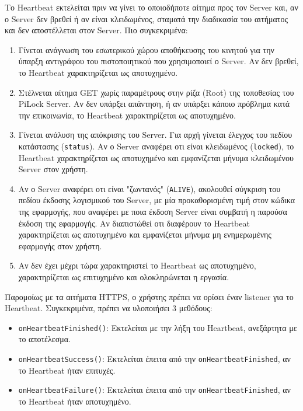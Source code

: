 	Το Heartbeat εκτελείται πριν να γίνει το οποιοδήποτε αίτημα προς τον Server και, αν ο Server δεν βρεθεί ή αν είναι κλειδωμένος, σταματά την διαδικασία του αιτήματος και δεν αποστέλλεται στον Server. Πιο συγκεκριμένα:
	\begin{enumerate}
		\item Γίνεται ανάγνωση του εσωτερικού χώρου αποθήκευσης του κινητού για την ύπαρξη αντιγράφου του πιστοποιητικού που χρησιμοποιεί ο Server. Αν δεν βρεθεί, το Heartbeat χαρακτηρίζεται ως αποτυχημένο.
		\item Στέλνεται αίτημα GET χωρίς παραμέτρους στην ρίζα (Root) της τοποθεσίας του PiLock Server. Αν δεν υπάρξει απάντηση, ή αν υπάρξει κάποιο πρόβλημα κατά την επικοινωνία, το Heartbeat χαρακτηρίζεται ως αποτυχημένο.
		\item Γίνεται ανάλυση της απόκρισης του Server. Για αρχή γίνεται έλεγχος του πεδίου κατάστασης (\verb|status|). Αν ο Server αναφέρει οτι είναι κλειδωμένος (\verb|locked|), το Heartbeat χαρακτηρίζεται ως αποτυχημένο και εμφανίζεται μήνυμα κλειδωμένου Server στον χρήστη. 
		\item Αν ο Server αναφέρει οτι είναι "ζωντανός" (\verb|ALIVE|), ακολουθεί σύγκριση του πεδίου έκδοσης λογισμικού του Server, με μία προκαθορισμένη τιμή στον κώδικα της εφαρμογής, που αναφέρει με ποια έκδοση Server είναι συμβατή η παρούσα έκδοση της εφαρμογής. Αν διαπιστώθεί οτι διαφέρουν το Heartbeat χαρακτηρίζεται ως αποτυχημένο και εμφανίζεται μήνυμα μη ενημερωμένης εφαρμογής στον χρήστη. 
		\item Αν δεν έχει μέχρι τώρα χαρακτηριστεί το Heartbeat ως αποτυχημένο, χαρακτηρίζεται ως επιτυχημένο και ολοκληρώνεται η εργασία.
	\end{enumerate}

	Παρομοίως με τα αιτήματα HTTPS, ο χρήστης πρέπει να ορίσει έναν listener για το Heartbeat. Συγκεκριμένα, πρέπει να υλοποιήσει 3 μεθόδους:

	\begin{itemize}
		\item \verb|onHeartbeatFinished()|: Εκτελείται με την λήξη του Heartbeat, ανεξάρτητα με το αποτέλεσμα.
		\item \verb|onHeartbeatSuccess()|: Εκτελείται έπειτα από την \verb|onHeartbeatFinished|, αν το Heartbeat ήταν επιτυχές.
		\item \verb|onHeartbeatFailure()|: Εκτελείται έπειτα από την \verb|onHeartbeatFinished|, αν το Heartbeat ήταν αποτυχημένο.
	\end{itemize}